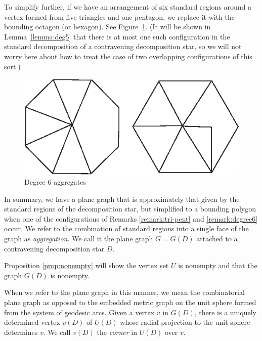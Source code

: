 \begin{remark}\label{remark:degree6}
To simplify further, if we have an arrangement of six standard
regions around a vertex formed from five triangles and one
pentagon, we replace it with the bounding octagon (or hexagon).
See Figure~\ref{fig:degree6}.  (It will be shown in
Lemma~\ref{lemma:deg5} that there is at most one such
configuration in the standard decomposition of a contravening
decomposition star, so we will not worry here about how to treat
the case of two overlapping configurations of this sort.)
\end{remark}
\begin{figure}[htb]
  \centering
  \includegraphics{PS/degree6.eps}
  \caption{Degree $6$ aggregates}
  \label{fig:degree6}
\end{figure}

In summary, we have a plane graph that is approximately that given
by the standard regions of the decomposition star, but simplified
to a bounding polygon when one of the configurations of Remarks
\ref{remark:tri-pent} and \ref{remark:degree6} occur.  We refer to
the combination of standard regions into a single face of the
graph as {\it aggregation}.  We call it the plane graph $G = G(D)$
attached to a contravening decomposition star $D$.
%

Proposition \ref{prop:nonempty} will show the vertex set $U$ is
nonempty and that the graph $G(D)$ is nonempty.

When we refer to the plane graph in this manner, we mean the
combinatorial plane graph as opposed to the embedded metric graph
on the unit sphere formed from the system of geodesic arcs.  Given
a vertex $v$ in $G(D)$, there is a uniquely determined vertex
$v(D)$ of $U(D)$ whose radial projection to the unit sphere
determines $v$.  We call $v(D)$ the {\it corner} in $U(D)$ over
$v$.
%

